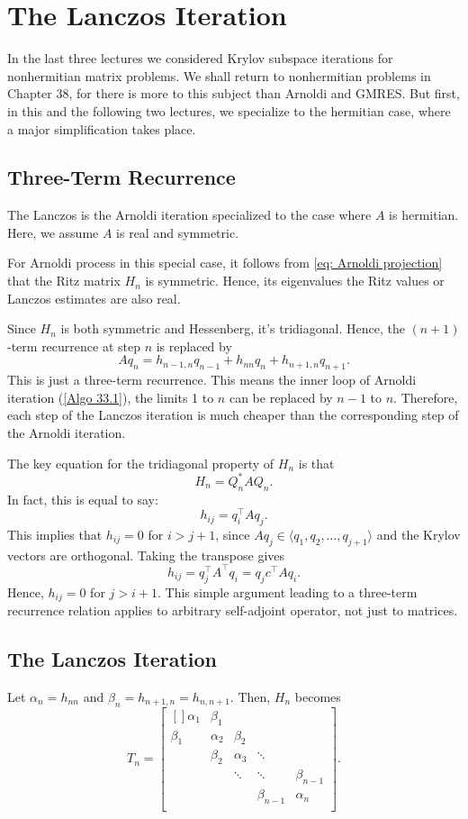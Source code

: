 \chapter{The Lanczos Iteration}
In the last three lectures we considered Krylov subspace iterations for nonhermitian matrix problems. We shall return to nonhermitian problems in Chapter 38, for there is more to this subject than Arnoldi and GMRES. But first, in this and the following two lectures, we specialize to the hermitian case, where a major simplification takes place.

\section{Three-Term Recurrence} 
 The Lanczos is the Arnoldi iteration specialized to the case where $ A $ is hermitian. Here, we assume $ A $ is real and symmetric. 

 For Arnoldi process in this special case, it follows from \eqref{eq: Arnoldi projection} that the Ritz matrix $ H_n $ is symmetric.  Hence, its eigenvalues the Ritz values or Lanczos estimates are also real. 

Since $ H_n $ is both symmetric and Hessenberg, it's tridiagonal. Hence, the $ (n+1) $-term recurrence at step $ n $ is replaced by 
\[
    Aq_n = h_{n-1, n} q_{n-1} + h_{nn} q_n + h_{n+1,n}q_{n+1}.  
\]
This is just a three-term recurrence. This means the inner loop of Arnoldi iteration (\autoref{Algo 33.1}), the limits 1 to $ n $ can be replaced by $ n-1 $ to $ n $.  Therefore, each step of the Lanczos iteration is much cheaper than the corresponding step of the Arnoldi iteration. 

The key equation for the tridiagonal property of $ H_n $ is that 
\[
    H_n = Q_n^*  A Q_n. 
\]
In fact, this is equal to say: 
\begin{equation}
\label{eq: element of H }
    h_{ij} = q_i^\top  A q_j. 
\end{equation}
This implies that $ h_{ij}=0$ for $ i>j+1 $, since $ Aq_j \in \langle q_1,q_2,\ldots ,q_{j+1} \rangle  $ and the Krylov vectors are orthogonal. Taking the transpose gives 
\[
    h_{ij} = q_j^\top A^\top q_i = q_jc^\top  A q_i.    
\]
Hence, $ h_{ij} = 0 $    for $ j>i+1 $. This simple argument leading to a three-term recurrence relation applies to arbitrary self-adjoint operator, not just to matrices.  


\section{ The Lanczos Iteration} 
Let $ \alpha _{n} = h_{nn} $ and $ \beta _{n} = h_{n+1,n} = h_{n,n+1} $. Then, $ H_{n} $ becomes 
\[
    T_{n} = \begin{bmatrix}[] 
        \alpha _{1} & \beta _{1} &  &  &   \\
        \beta _{1} & \alpha _2  & \beta _2  &  &   \\
         &  \beta _2& \alpha _3  &\ddots  &   \\
         &  & \ddots  &\ddots  & \beta _{n-1}   \\
         &  &  & \beta _{n-1}  & \alpha _n     \\
    \end{bmatrix} . 
\] 

